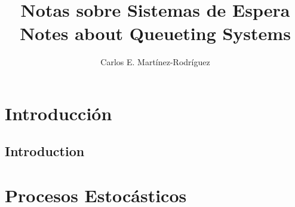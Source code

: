 \documentclass{article}
\title{Notas sobre Sistemas de Espera\\
\small{Notes about Queueting Systems}}
\author{Carlos E. Martínez-Rodríguez}
\date{}
\renewcommand{\abstractname}{Resumen}
\numberwithin{equation}{section}
\newcommand{\acmclass}[1]{\noindent\textbf{ACM Class:} #1\\}
\newcommand{\mscclass}[1]{\noindent\textbf{MSC Class:} #1\\}
\begin{document}
\maketitle

\begin{abstract}
\end{abstract}

\begin{otherlanguage}{english}
\renewcommand{\abstractname}{Abstract} %
\begin{abstract}

\end{abstract}
\end{otherlanguage}

\tableofcontents

\section*{Introducción}


\begin{otherlanguage}{english}
\renewcommand{\abstractname}{Abstract} %
\section*{Introduction}
\end{otherlanguage}


\section{Procesos Estoc\'asticos}\label{Procesos.Estocasticos}
\end{document}
